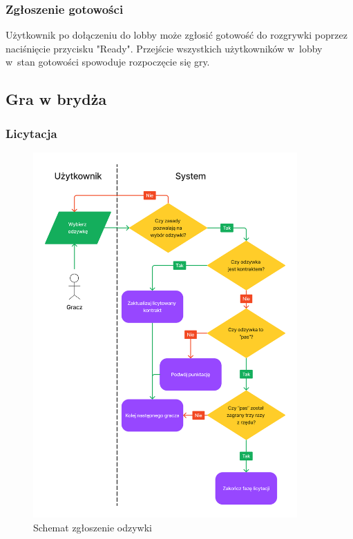 \FloatBarrier


\subsubsection{Zgłoszenie gotowości}
Użytkownik po dołączeniu do lobby może zgłosić gotowość do rozgrywki poprzez
naciśnięcie przycisku "Ready". Przejście wszystkich użytkowników w~lobby
w~stan gotowości spowoduje rozpoczęcie się gry.


\subsection{Gra w brydża}

\subsubsection{Licytacja}

\begin{figure}[hbt!]
  \centering
  \includegraphics[width=0.9\textwidth]{img/schematy/bid.png}
  \caption{Schemat zgłoszenie odzywki}
  \label{fig:figma_xd_bid}
\end{figure}

